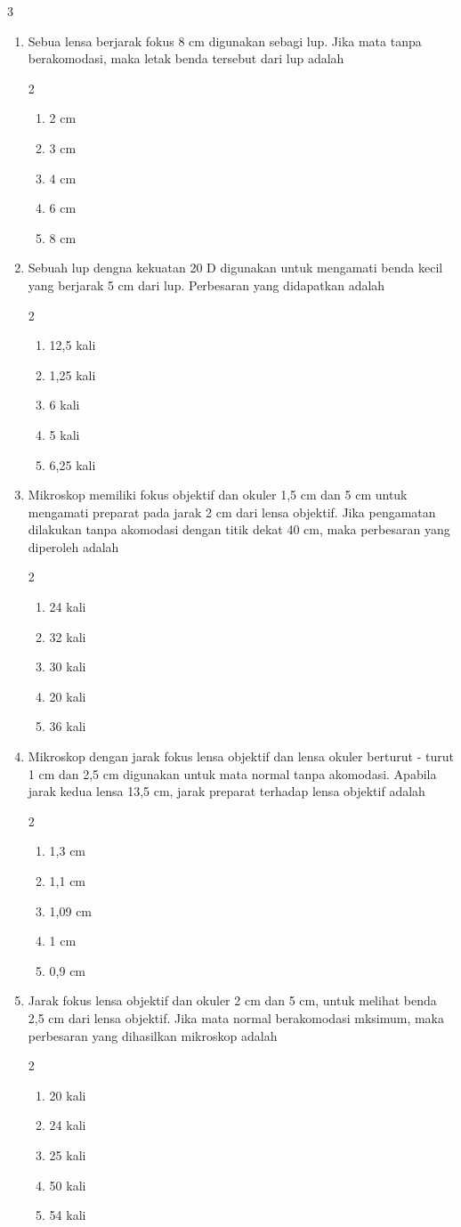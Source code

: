 \documentclass[10pt,a4paper]{extarticle}
\newcommand{\pilgani}[1]{                            \vspace{-0.3cm}\begin{multicols}{2}
 \begin{enumerate}[label=\Alph*., itemsep=0pt,topsep=0pt,leftmargin=*,align=Center]#1                     \end{enumerate}
 \phantom{ini cuma sapi, wedus, dan ayam}
 \end{multicols}}
\begin{document}
\begin{multicols}{3}
\begin{enumerate}
\item Sebua lensa berjarak fokus 8 cm digunakan sebagi lup. Jika mata tanpa berakomodasi, maka letak benda tersebut dari lup adalah 
\pilgani{
   \item 2 cm
   \item 3 cm
   \item 4 cm
   \item 6 cm
   \item 8 cm }
\vspace{1.5cm}
\item Sebuah lup dengna kekuatan 20 D digunakan untuk mengamati benda kecil yang berjarak 5 cm dari lup. Perbesaran yang didapatkan adalah
\pilgani{
   \item 12,5 kali
   \item 1,25 kali
   \item 6 kali
   \item 5 kali
   \item 6,25 kali
}
\vspace{1.7cm}
\item Mikroskop memiliki fokus objektif dan okuler 1,5 cm dan 5 cm untuk mengamati preparat pada jarak 2 cm dari lensa objektif. Jika pengamatan dilakukan tanpa akomodasi dengan titik dekat 40 cm, maka perbesaran yang diperoleh adalah
\pilgani{
   \item 24 kali
   \item 32 kali
   \item 30 kali
   \item 20 kali
   \item 36 kali }
   \vspace{2cm}

\item Mikroskop dengan jarak fokus lensa objektif dan lensa okuler berturut - turut 1 cm dan 2,5 cm  digunakan untuk mata normal tanpa akomodasi. Apabila jarak kedua lensa 13,5 cm, jarak preparat terhadap lensa objektif adalah
\pilgani{
   \item 1,3 cm
   \item 1,1 cm
   \item 1,09 cm
   \item 1 cm
   \item 0,9 cm }
\vspace{2cm}

\item Jarak fokus lensa objektif dan okuler 2 cm dan 5 cm, untuk melihat benda 2,5 cm dari lensa objektif. Jika mata normal berakomodasi mksimum, maka perbesaran yang dihasilkan mikroskop adalah
\pilgani{
   \item 20 kali
   \item 24 kali
   \item 25 kali
   \item 50 kali
   \item 54 kali}
\vspace{2cm}


\end{enumerate}
\end{multicols}
\end{document}
